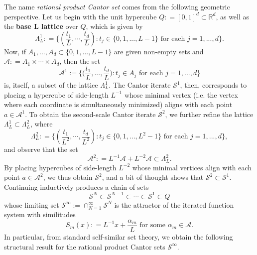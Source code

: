 \documentclass[12pt]{amsart}
\numberwithin{equation}{section}
\begin{document}
The name \textit{rational product Cantor set} comes from the following geometric perspective. Let us begin with the unit hypercube $Q : = [0,1]^d \subset \mathbb{R}^d$, as well as the \textbf{base $\bm{L}$ lattice} over $Q$, which is given by
$$
\Lambda_L^1 : = \{(\frac{t_1}{L},\cdots,\frac{t_d}{L}) : t_j \in \{0,1,...,L-1\} \textrm{ for each } j =1,...,d \}.
$$
Now, if $A_1,...,A_d \subset \{0,1,...,L-1\}$ are given non-empty sets and $\mathcal{A} : = A_1 \times \cdots \times A_d$, then the set
\begin{equation}\label{ch2:eq:rationalproductdigits}
\mathcal{A}^1 := \{\big(\frac{t_1}{L},...,\frac{t_d}{L} \big) : t_j \in A_j \textrm{ for each } j = 1,...,d\}
\end{equation}
is, itself, a subset of the lattice $\Lambda_L^1$. The Cantor iterate $\mathcal{S}^1$, then, corresponds to placing a hypercube of side-length $L^{-1}$ whose minimal vertex (i.e. the vertex where each coordinate is simultaneously minimized) aligns with each point $a \in \mathcal{A}^1$. To obtain the second-scale Cantor iterate $\mathcal{S}^2$, we further refine the lattice $\Lambda_L^1 \subset \Lambda_L^2$, where
$$
\Lambda_L^2 : = \{(\frac{t_1}{L^2},\cdots,\frac{t_d}{L^2}) : t_j \in \{0,1,...,L^2-1\} \textrm{ for each } j =1,...,d \},
$$
and observe that the set
$$
\mathcal{A}^2 : = L^{-1} \mathcal{A} + L^{-2} \mathcal{A} \subset \Lambda_L^2.
$$
By placing hypercubes of side-length $L^{-2}$ whose minimal vertices align with each point $a \in \mathcal{A}^2$, we thus obtain $\mathcal{S}^2$, and a bit of thought shows that $\mathcal{S}^2 \subset \mathcal{S}^1$. Continuing inductively produces a chain of sets
$$
\mathcal{S}^N \subset \mathcal{S}^{N-1} \subset \cdots \subset \mathcal{S}^1 \subset Q
$$
whose limiting set $\mathcal{S}^{\infty} := \cap_{N=1}^{\infty} \mathcal{S}^N$
is the attractor of the iterated function system with similitudes
$$
S_m (x) : = L^{-1} x + \frac{\alpha_m}{L} \textrm{ for some } \alpha_m \in \mathcal{A}.
$$
In particular, from standard self-similar set theory, we obtain the following structural result for the rational product Cantor sets $\mathcal{S}^{\infty}$.

\medskip
\end{document}
